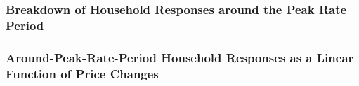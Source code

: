 \subsubsection{Breakdown of Household Responses around the Peak Rate Period}
\label{Sub-subsection:Breakdown-of-Household-Responses-around-the-Peak-Rate-Period}



\subsubsection{Around-Peak-Rate-Period Household Responses as a Linear Function of Price Changes}
\label{Sub-subsection:Around-Peak-Rate-Period-Household-Responses-as-a-Linear-Function-of-Price-Changes}


